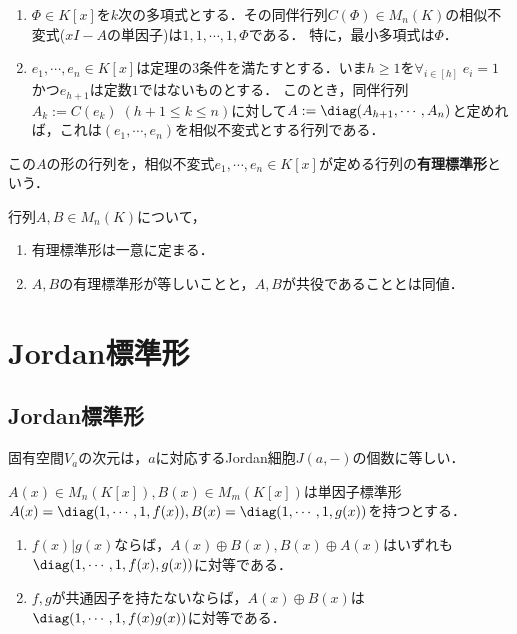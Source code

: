 \documentclass[uplatex, dvipdfmx]{jsreport}
\begin{document}
\begin{theorem}[行列の有理標準形と単因子の対応]\mbox{}
    \begin{enumerate}
        \item $\Phi\in K[x]$を$k$次の多項式とする．その同伴行列$C(\Phi)\in M_n(K)$の相似不変式($xI-A$の単因子)は$1,1,\cdots,1,\Phi$である．
        特に，最小多項式は$\Phi$．
        \item $e_1,\cdots,e_n\in K[x]$は定理の3条件を満たすとする．いま$h\ge1$を$\forall_{i\in[h]}\;e_i=1$かつ$e_{h+1}$は定数$1$ではないものとする．
        このとき，同伴行列$A_{k}:=C(e_k)\;(h+1\le k\le n)$に対して$A:=\diag(A_{h+1},\cdots,A_{n})$と定めれば，これは$(e_1,\cdots,e_n)$を相似不変式とする行列である．
    \end{enumerate}
    この$A$の形の行列を，相似不変式$e_1,\cdots,e_n\in K[x]$が定める行列の\textbf{有理標準形}という．
\end{theorem}

\begin{corollary}
    行列$A,B\in M_n(K)$について，
    \begin{enumerate}
        \item 有理標準形は一意に定まる．
        \item $A,B$の有理標準形が等しいことと，$A,B$が共役であることとは同値．
    \end{enumerate}
\end{corollary}

\section{Jordan標準形}

\subsection{Jordan標準形}

\begin{tcolorbox}[colframe=ForestGreen, colback=ForestGreen!10!white,breakable,colbacktitle=ForestGreen!40!white,coltitle=black,fonttitle=\bfseries\sffamily,
title=]
    固有空間$V_a$の次元は，$a$に対応するJordan細胞$J(a,-)$の個数に等しい．
\end{tcolorbox}

\begin{lemma}[$x$-行列の直和の標準形]
    $A(x)\in M_n(K[x]),B(x)\in M_m(K[x])$は単因子標準形$A(x)=\diag(1,\cdots,1,f(x)),B(x)=\diag(1,\cdots,1,g(x))$を持つとする．
    \begin{enumerate}
        \item $f(x)|g(x)$ならば，$A(x)\oplus B(x),B(x)\oplus A(x)$はいずれも$\diag(1,\cdots,1,f(x),g(x))$に対等である．
        \item $f,g$が共通因子を持たないならば，$A(x)\oplus B(x)$は$\diag(1,\cdots,1,f(x)g(x))$に対等である．
    \end{enumerate}
\end{lemma}
\end{document}
